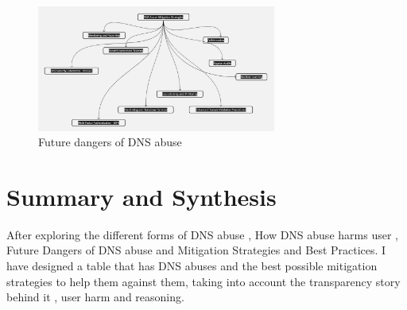 \captionsetup{font= footnotesize}
\begin{figure}[H]
\centering
\includegraphics[width=0.7\textwidth]{background/DNSabuseMiti.jpg}
\caption{Future dangers of DNS abuse}
\label{fig:figureSix}
\end{figure}




\section{Summary and Synthesis}

After exploring the different forms of DNS abuse , How DNS abuse harms user , Future Dangers of DNS abuse and Mitigation Strategies and Best Practices. I have designed a table that has DNS abuses and the best possible mitigation strategies to help them against them, taking into account the transparency story behind it , user harm and reasoning. 

